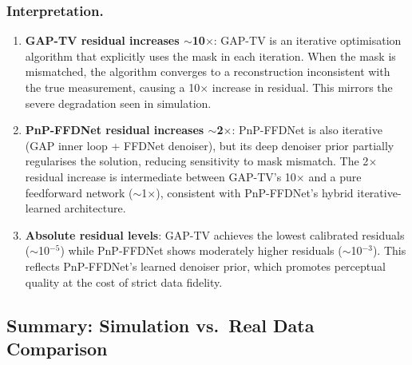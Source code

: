 \documentclass[runningheads]{llncs}
\begin{document}
\subsubsection{Interpretation.}
\begin{enumerate}
    \item \textbf{GAP-TV residual increases $\sim$10$\times$}: GAP-TV is an iterative optimisation algorithm that explicitly uses the mask in each iteration. When the mask is mismatched, the algorithm converges to a reconstruction inconsistent with the true measurement, causing a 10$\times$ increase in residual. This mirrors the severe degradation seen in simulation.
    \item \textbf{PnP-FFDNet residual increases $\sim$2$\times$}: PnP-FFDNet is also iterative (GAP inner loop + FFDNet denoiser), but its deep denoiser prior partially regularises the solution, reducing sensitivity to mask mismatch. The 2$\times$ residual increase is intermediate between GAP-TV's 10$\times$ and a pure feedforward network ($\sim$1$\times$), consistent with PnP-FFDNet's hybrid iterative-learned architecture.
    \item \textbf{Absolute residual levels}: GAP-TV achieves the lowest calibrated residuals ($\sim$10$^{-5}$) while PnP-FFDNet shows moderately higher residuals ($\sim$10$^{-3}$). This reflects PnP-FFDNet's learned denoiser prior, which promotes perceptual quality at the cost of strict data fidelity.
\end{enumerate}

\subsection{Summary: Simulation vs.\ Real Data Comparison}
\end{document}

